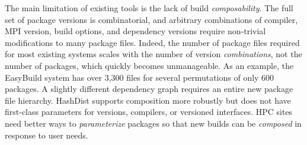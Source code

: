 
The main limitation of existing tools is the lack of build {\it composability}.
The full set of package versions is combinatorial, and arbitrary combinations 
of compiler, MPI version, build options, and dependency versions require 
non-trivial modifications to many package files. Indeed, the number of package 
files required for most existing systems scales with the number of version 
{\it combinations}, not the number of packages, which quickly becomes 
unmanageable.  As an example, the EasyBuild system has over 3,300 files for 
several permutations of only 600 packages. A slightly different dependency 
graph requires an entire new package file hierarchy.  HashDist supports 
composition more robustly but does not have first-class parameters for 
versions, compilers, or versioned interfaces.
%
HPC sites need better ways to {\it parameterize} packages so that new
builds can be {\it composed} in response to user needs.
%
